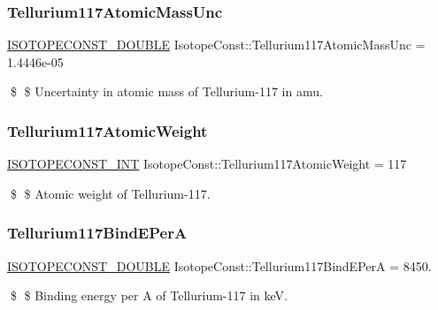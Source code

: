 \subsubsection{\texorpdfstring{Tellurium117\+Atomic\+Mass\+Unc}{Tellurium117AtomicMassUnc}}
{\footnotesize\ttfamily \mbox{\hyperlink{group___isotope_const-_macros_ga8f45a7272ce02c0b4c65c44636ed719a}{I\+S\+O\+T\+O\+P\+E\+C\+O\+N\+S\+T\+\_\+\+D\+O\+U\+B\+LE}} Isotope\+Const\+::\+Tellurium117\+Atomic\+Mass\+Unc = 1.\+4446e-\/05}

\$ \$ Uncertainty in atomic mass of Tellurium-\/117 in amu. \mbox{\label{group___isotope_const-_tellurium-_te117_ga0f1979628b629cf03007962374685ae0}} 
\subsubsection{\texorpdfstring{Tellurium117\+Atomic\+Weight}{Tellurium117AtomicWeight}}
{\footnotesize\ttfamily \mbox{\hyperlink{group___isotope_const-_macros_ga5f18360b3e99483a35c32d789e62621c}{I\+S\+O\+T\+O\+P\+E\+C\+O\+N\+S\+T\+\_\+\+I\+NT}} Isotope\+Const\+::\+Tellurium117\+Atomic\+Weight = 117}

\$ \$ Atomic weight of Tellurium-\/117. \mbox{\label{group___isotope_const-_tellurium-_te117_gac898e4ef95316fb17e9a44cc97a1b48d}} 
\subsubsection{\texorpdfstring{Tellurium117\+Bind\+E\+PerA}{Tellurium117BindEPerA}}
{\footnotesize\ttfamily \mbox{\hyperlink{group___isotope_const-_macros_ga8f45a7272ce02c0b4c65c44636ed719a}{I\+S\+O\+T\+O\+P\+E\+C\+O\+N\+S\+T\+\_\+\+D\+O\+U\+B\+LE}} Isotope\+Const\+::\+Tellurium117\+Bind\+E\+PerA = 8450.}

\$ \$ Binding energy per A of Tellurium-\/117 in keV. \mbox{\label{group___isotope_const-_tellurium-_te117_ga10a074706695adb9d8a2a983bda827dd}} 
